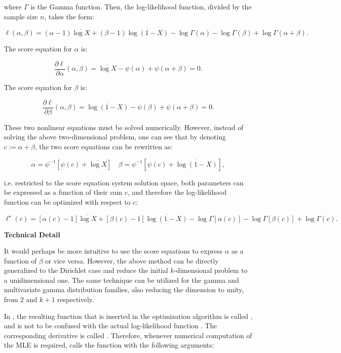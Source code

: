 \documentclass[nojss]{jss}
\newcommand{\fct}[1]{\code{#1()}}
\begin{document}
where \( \Gamma \) is the Gamma function. Then, the log-likelihood function, divided by the sample size $n$, takes the form:

\[
\ell(\alpha, \beta) = (\alpha - 1) \overline{\log X} + (\beta - 1) \overline{\log (1 - X)} - \log \Gamma(\alpha) - \log \Gamma(\beta) + \log \Gamma(\alpha + \beta).
\]

The score equation for \( \alpha \) is:

\[
\frac{\partial \ell}{\partial \alpha}(\alpha, \beta) = \overline{\log X} - \psi(\alpha) + \psi(\alpha + \beta) = 0.
\]

The score equation for \( \beta \) is:

\[
\frac{\partial \ell}{\partial \beta}(\alpha, \beta) = \overline{\log (1 - X)} - \psi(\beta) + \psi(\alpha + \beta) = 0.
\]

These two nonlinear equations must be solved numerically. However, instead of solving the above two-dimensional problem, one can see that by denoting $c := \alpha + \beta$, the two score equations can be rewritten as:

\[
  \alpha = \psi^{-1}\left[\psi(c) + \overline{\log X}\right] \quad \beta = \psi^{-1}\left[\psi(c) + \overline{\log (1-X)}\right],
\]

i.e. restricted to the score equation system solution space, both parameters can be expressed as a function of their sum $c$, and therefore the log-likelihood function can be optimized with respect to $c$:

\[
\ell^\star(c) = \left[\alpha(c) - 1\right] \overline{\log X} + \left[\beta(c) - 1\right] \overline{\log (1 - X)} - \log \Gamma\left[\alpha(c)\right] - \log \Gamma\left[\beta(c)\right] + \log \Gamma(c).
\]

\begin{leftbar}
\textbf{Technical Detail}

It would perhaps be more intuitive to use the score equations to express $\alpha$ as a function of $\beta$ or vice versa. However, the above method can be directly generalized to the Dirichlet case and reduce the initial $k$-dimensional problem to a unidimensional one. The same technique can be utilized for the gamma and multivariate gamma distribution families, also reducing the dimension to unity, from $2$ and $k+1$ respectively.
\end{leftbar}

In , the resulting function that is inserted in the optimization algorithm is called \fct{lloptim}, and is not to be confused with the actual log-likelihood function \fct{ll}. The corresponding derivative is called \fct{dlloptim}. Therefore, whenever numerical computation of the MLE is required,  calls the \fct{optim} function with the following arguments:
\end{document}
